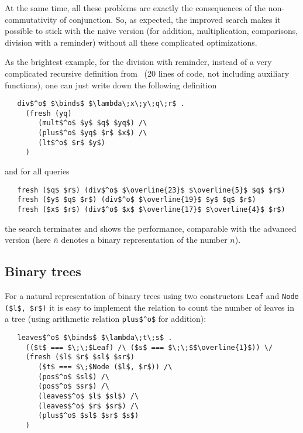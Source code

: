 At the same time, all these problems are exactly the consequences of the non-commutativity 
of conjunction. So, as expected, the improved search makes it possible to stick with
the naive version (for addition, multiplication, comparisons, division with a reminder)
without all these complicated optimizations. 

As the brightest example, for the division with reminder, instead of a very complicated recursive definition 
from~\cite{TRS} (20 lines of code, not including auxiliary functions), one can just write down the 
following definition

\begin{lstlisting}
   div$^o$ $\binds$ $\lambda\;x\;y\;q\;r$ . 
     (fresh (yq)        
        (mult$^o$ $y$ $q$ $yq$) /\
        (plus$^o$ $yq$ $r$ $x$) /\
        (lt$^o$ $r$ $y$)
     )
\end{lstlisting}

\noindent and for all queries

\begin{lstlisting}
   fresh ($q$ $r$) (div$^o$ $\overline{23}$ $\overline{5}$ $q$ $r$)
   fresh ($y$ $q$ $r$) (div$^o$ $\overline{19}$ $y$ $q$ $r$)
   fresh ($x$ $r$) (div$^o$ $x$ $\overline{17}$ $\overline{4}$ $r$)
\end{lstlisting}

\noindent the search terminates and shows the performance, comparable with the advanced version 
(here $\overline{n}$ denotes a binary representation of the number $n$).

\subsection{Binary trees}

For a natural representation of binary trees using two constructors \lstinline|Leaf| and 
\lstinline|Node ($l$, $r$)| it is easy to implement the relation to count the number of 
leaves in a tree (using arithmetic relation \lstinline|plus$^o$| for addition):

\begin{lstlisting}
   leaves$^o$ $\binds$ $\lambda\;t\;s$ .
     (($t$ === $\;\;$Leaf) /\ ($s$ === $\;\;$$\overline{1}$)) \/
     (fresh ($l$ $r$ $sl$ $sr$)
        ($t$ === $\;$Node ($l$, $r$)) /\
        (pos$^o$ $sl$) /\
        (pos$^o$ $sr$) /\
        (leaves$^o$ $l$ $sl$) /\
        (leaves$^o$ $r$ $sr$) /\
        (plus$^o$ $sl$ $sr$ $s$)
     )
\end{lstlisting}

